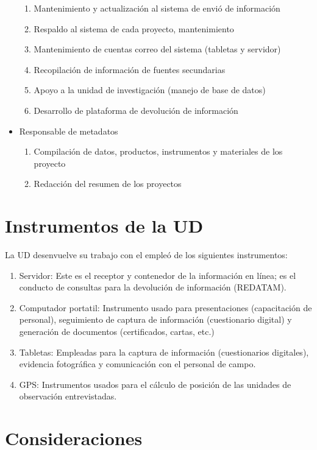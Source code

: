 \documentclass{article}
\begin{document}
\begin{itemize}
\begin{enumerate}
\item Mantenimiento y actualización al sistema de envió de información
\item Respaldo al sistema de cada proyecto, mantenimiento 
\item Mantenimiento de cuentas correo del sistema (tabletas y servidor)
\item Recopilación de información de fuentes secundarias 
\item Apoyo a la unidad de investigación (manejo de base de datos)
\item Desarrollo de plataforma de devolución de información
\end{enumerate} 
\item Responsable de metadatos
\begin{enumerate}
\item Compilación de datos, productos, instrumentos y materiales de los proyecto
\item Redacción del resumen de los proyectos
\end{enumerate} 
\end{itemize} 



\section{Instrumentos de la UD}

La UD desenvuelve su trabajo con el empleó de los siguientes instrumentos:

\begin{enumerate}
\item Servidor: Este es el receptor y contenedor de la información en línea; es el conducto de consultas para la devolución de información (REDATAM).  
\item Computador portatil: Instrumento usado para presentaciones (capacitación de personal), seguimiento de captura de información (cuestionario digital) y generación de documentos (certificados, cartas, etc.)    
\item Tabletas: Empleadas para la captura de información (cuestionarios digitales), evidencia fotográfica y comunicación con el personal de campo.
\item GPS: Instrumentos usados para el cálculo de posición de las unidades de observación entrevistadas.
\end{enumerate} 

\section{Consideraciones}
\end{document}
